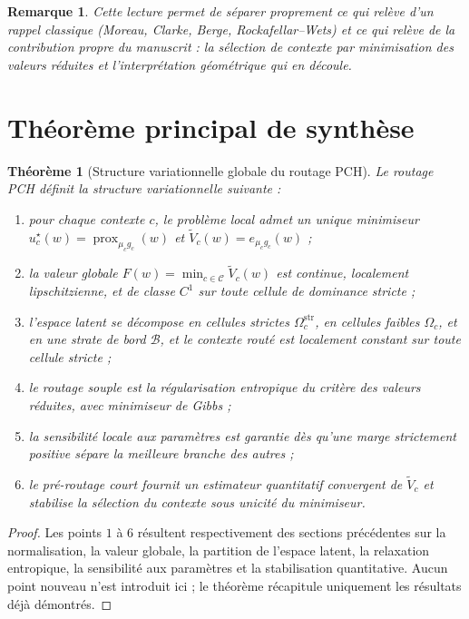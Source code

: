 \documentclass[11pt,a4paper]{article}
\newtheorem{theorem}{Théorème}[section]
\newtheorem{remark}{Remarque}[section]
\DeclareMathOperator{\prox}{prox}
\newcommand{\Ccal}{\mathcal C}
\newcommand{\Bcal}{\mathcal B}
\begin{document}
\begin{remark}
Cette lecture permet de séparer proprement ce qui relève d'un rappel classique (Moreau, Clarke, Berge, Rockafellar--Wets) et ce qui relève de la contribution propre du manuscrit : la sélection de contexte par minimisation des valeurs réduites et l'interprétation géométrique qui en découle.
\end{remark}

\section{Théorème principal de synthèse}

\begin{theorem}[Structure variationnelle globale du routage PCH]
Le routage PCH définit la structure variationnelle suivante :
\begin{enumerate}[leftmargin=2em]
\item pour chaque contexte \(c\), le problème local admet un unique minimiseur \(u_c^\star(w)=\prox_{\mu_c g_c}(w)\) et \(\widetilde V_c(w)=e_{\mu_c g_c}(w)\) ;
\item la valeur globale \(F(w)=\min_{c\in\Ccal}\widetilde V_c(w)\) est continue, localement lipschitzienne, et de classe \(C^1\) sur toute cellule de dominance stricte ;
\item l'espace latent se décompose en cellules strictes \(\Omega_c^{\mathrm{str}}\), en cellules faibles \(\Omega_c\), et en une strate de bord \(\Bcal\), et le contexte routé est localement constant sur toute cellule stricte ;
\item le routage souple est la régularisation entropique du critère des valeurs réduites, avec minimiseur de Gibbs ;
\item la sensibilité locale aux paramètres est garantie dès qu'une marge strictement positive sépare la meilleure branche des autres ;
\item le pré-routage court fournit un estimateur quantitatif convergent de \(\widetilde V_c\) et stabilise la sélection du contexte sous unicité du minimiseur.
\end{enumerate}
\end{theorem}

\begin{proof}
Les points \(1\) à \(6\) résultent respectivement des sections précédentes sur la normalisation, la valeur globale, la partition de l'espace latent, la relaxation entropique, la sensibilité aux paramètres et la stabilisation quantitative. Aucun point nouveau n'est introduit ici ; le théorème récapitule uniquement les résultats déjà démontrés.
\end{proof}
\end{document}
